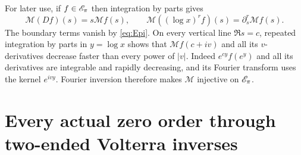 \documentclass[11pt]{article}
\newcommand{\Mell}{\mathcal M}\newcommand{\Sch}{\mathcal S}
\begin{document}
For later use, if $f\in\mathscr E_\pi$ then integration by parts gives
\begin{equation}\label{eq:Mellin-rules}
\Mell(Df)(s)=s\Mell f(s),\qquad
\Mell((\log x)^rf)(s)=\partial_s^r\Mell f(s).
\end{equation}
The boundary terms vanish by \eqref{eq:Epi}. On every vertical line
$\Re s=c$, repeated integration by parts in $y=\log x$ shows that
$\Mell f(c+iv)$ and all its $v$-derivatives decrease faster than every
power of $|v|$. Indeed $e^{cy}f(e^y)$ and all its derivatives are
integrable and rapidly decreasing, and its Fourier transform uses
the kernel $e^{ivy}$. Fourier inversion therefore makes $\Mell$
injective on $\mathscr E_\pi$.

\section{Every actual zero order through two-ended Volterra inverses}
\end{document}
